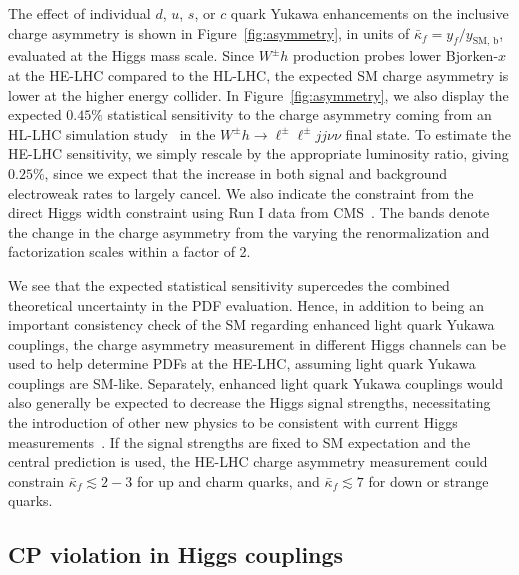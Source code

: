 \documentclass[../report.tex]{subfiles}
\begin{document}
The effect of individual $d$, $u$, $s$, or $c$ quark Yukawa
enhancements on the inclusive charge asymmetry is shown in
Figure~\ref{fig:asymmetry}, in units of $\bar{\kappa}_f = y_f /
y_{\text{SM, b}}$, evaluated at the Higgs mass scale.  Since $W^\pm h$
production probes lower Bjorken-$x$ at the HE-LHC compared to the
HL-LHC, the expected SM charge asymmetry is lower at the higher energy
collider.  In Figure~\ref{fig:asymmetry}, we also display the expected
$0.45\%$ statistical sensitivity to the charge asymmetry coming from
an HL-LHC simulation study~\cite{Yu:2016rvv} in the $W^\pm h \to
\ell^\pm \ell^\pm jj \nu \nu$ final state.  To estimate the HE-LHC
sensitivity, we simply rescale by the appropriate luminosity ratio,
giving $0.25\%$, since we expect that the increase in both signal and
background electroweak rates to largely cancel.  We also indicate the
constraint from the direct Higgs width constraint using Run I data
from CMS~\cite{Yu:2016rvv}.  The bands denote the change in the charge
asymmetry from the varying the renormalization and factorization
scales within a factor of 2.

We see that the expected statistical sensitivity supercedes the
combined theoretical uncertainty in the PDF evaluation.  Hence, in
addition to being an important consistency check of the SM regarding
enhanced light quark Yukawa couplings, the charge asymmetry
measurement in different Higgs channels can be used to help determine
PDFs at the HE-LHC, assuming light quark Yukawa couplings are SM-like.
Separately, enhanced light quark Yukawa couplings would also generally
be expected to decrease the Higgs signal strengths, necessitating the
introduction of other new physics to be consistent with current Higgs
measurements~\cite{Yu:2016rvv}.  If the signal strengths are fixed to
SM expectation and the central prediction is used, the HE-LHC charge
asymmetry measurement could constrain $\bar{\kappa}_f \lesssim 2-3$
for up and charm quarks, and $\bar{\kappa}_f \lesssim 7$ for down or
strange quarks.



\subsection{CP violation in Higgs couplings %
}
\end{document}
